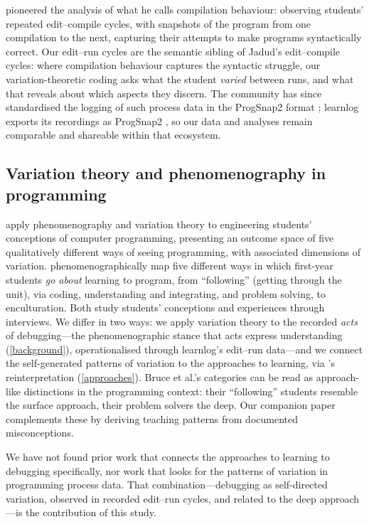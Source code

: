 \Textcite{Jadud2006} pioneered the analysis of what he calls compilation
behaviour: observing students' repeated edit--compile cycles, with
snapshots of the program from one compilation to the next, capturing their
attempts to make programs syntactically correct.
Our edit--run cycles are the semantic sibling of Jadud's edit--compile
cycles: where compilation behaviour captures the syntactic struggle, our
variation-theoretic coding asks what the student \emph{varied} between
runs, and what that reveals about which aspects they discern.
The community has since standardised the logging of such process data in
the ProgSnap2 format \autocite{ProgSnap2}; learnlog exports its recordings
as ProgSnap2 \autocite{learnlog}, so our data and analyses remain
comparable and shareable within that ecosystem.

\subsection{Variation theory and phenomenography in programming}

\Textcite{ThuneEckerdal2009} apply phenomenography and variation theory to
engineering students' conceptions of computer programming, presenting an
outcome space of five qualitatively different ways of seeing programming,
with associated dimensions of variation.
\Textcite{BruceLearningToProgram} phenomenographically map five different
ways in which first-year students \emph{go about} learning to program,
from \enquote{following} (getting through the unit), via coding,
understanding and integrating, and problem solving, to enculturation.
Both study students' conceptions and experiences through interviews.
We differ in two ways: we apply variation theory to the recorded
\emph{acts} of debugging---the phenomenographic stance that acts express
understanding (\cref{background}), operationalised through learnlog's
edit--run data---and we connect the self-generated patterns of variation
to the approaches to learning, via \citeauthor{NCOL}'s reinterpretation
(\cref{approaches}).
Bruce et al.'s categories can be read as approach-like distinctions in the
programming context: their \enquote{following} students resemble the
surface approach, their problem solvers the deep.
Our companion paper \autocite{VTProgMisconceptions} complements these by
deriving teaching patterns from documented misconceptions.

We have not found prior work that connects the approaches to learning to
debugging specifically, nor work that looks for the patterns of variation
in programming process data.
That combination---debugging as self-directed variation, observed in
recorded edit--run cycles, and related to the deep approach---is the
contribution of this study.

